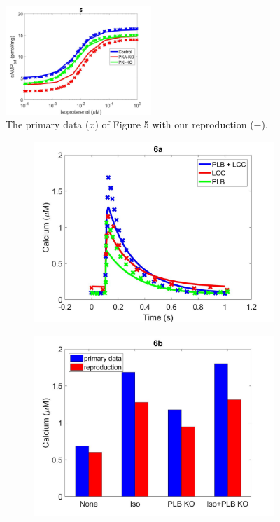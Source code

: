 \documentclass[fleqn,10pt]{physiome}
\begin{document}
\begin{figure}
    \centering
    \includegraphics[width=0.49\textwidth]{figures/F5.jpg}
    \caption{The primary data ($x$) of Figure 5 with our reproduction ($-$).}
    \label{fig:5}
\end{figure}

\begin{figure}
    \centering
    \begin{subfigure}[b]{0.49\textwidth}
        \centering
        \includegraphics[width=\textwidth]{figures/F6a.jpg}
    \end{subfigure}
    \begin{subfigure}[b]{0.49\textwidth}
        \centering
        \includegraphics[width=\textwidth]{figures/F6b.jpg}

\end{subfigure}
\end{figure}
\end{document}
